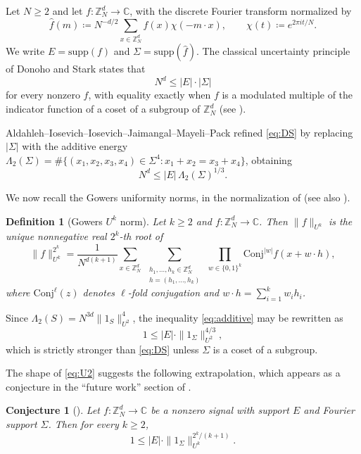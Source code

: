 \documentclass[12pt]{amsart}
\newcommand{\Z}{\mathbb{Z}}
\newcommand{\C}{\mathbb{C}}
\newcommand{\supp}{\mathrm{supp}}
\newcommand{\Conj}{\mathrm{Conj}}
\newtheorem{definition}[theorem]{Definition}
\newtheorem{conjecture}[theorem]{Conjecture}
\begin{document}
Let $N\ge2$ and let $f:\Z_N^d\to\C$, with the discrete Fourier transform normalized by
\[
\hat f(m)\coloneq N^{-d/2}\sum_{x\in\Z_N^d}f(x)\chi(-m\cdot x),
\qquad
\chi(t)\coloneq e^{2\pi i t/N}.
\]
We write $E=\supp(f)$ and $\Sigma=\supp(\hat f)$. The classical uncertainty principle of Donoho and Stark \cite{DonohoStark} states that
\begin{equation}\label{eq:DS}
N^d\le |E|\cdot|\Sigma|
\end{equation}
for every nonzero $f$, with equality exactly when $f$ is a modulated multiple of the indicator function of a coset of a subgroup of $\Z_N^d$ (see \cite{MatolcsiSzucs}).

Aldahleh--Iosevich--Iosevich--Jaimangal--Mayeli--Pack \cite{2025additiveenergyuncertaintyprinciple} refined \eqref{eq:DS} by replacing $|\Sigma|$ with the additive energy
$\Lambda_2(\Sigma)=\#\{(x_1,x_2,x_3,x_4)\in\Sigma^4: x_1+x_2=x_3+x_4\}$, obtaining
\begin{equation}\label{eq:additive}
N^d\le |E|\,\Lambda_2(\Sigma)^{1/3}.
\end{equation}

We now recall the Gowers uniformity norms, in the normalization of \cite{2025additiveenergyuncertaintyprinciple} (see also \cite[Chapter 11]{Tao-Vu-2006}).

\begin{definition}[Gowers $U^k$ norm]\label{def:gowers}
Let $k\ge 2$ and $f:\Z_N^d\to\C$. Then $\|f\|_{U^k}$ is the unique nonnegative real $2^k$-th root of
\[
\|f\|_{U^k}^{2^k}
=
\frac{1}{N^{d(k+1)}}
\sum_{x\in\Z_N^d}\ \sum_{\substack{h_1,\dots,h_k\in\Z_N^d\\ h=(h_1,\dots,h_k)}}\ \prod_{w\in\{0,1\}^k}\Conj^{|w|}f(x+w\cdot h),
\]
where $\Conj^\ell(z)$ denotes $\ell$-fold conjugation and $w\cdot h=\sum_{i=1}^k w_ih_i$.
\end{definition}

Since $\Lambda_2(S)=N^{3d}\|1_S\|_{U^2}^4$, the inequality \eqref{eq:additive} may be rewritten as
\begin{equation}\label{eq:U2}
1\le |E|\cdot\|1_\Sigma\|_{U^2}^{4/3},
\end{equation}
which is strictly stronger than \eqref{eq:DS} unless $\Sigma$ is a coset of a subgroup.

The shape of \eqref{eq:U2} suggests the following extrapolation, which appears as a conjecture in the ``future work'' section of \cite{RefinedUncertainty}.

\begin{conjecture}[{\cite[Conjecture 5.2]{RefinedUncertainty}}]\label{conj:main}
Let $f:\Z_N^d\to\C$ be a nonzero signal with support $E$ and Fourier support $\Sigma$. Then for every $k\ge2$,
\begin{equation}\label{eq:conj}
1\le |E|\cdot\|1_\Sigma\|_{U^k}^{2^k/(k+1)}.
\end{equation}
\end{conjecture}
\end{document}
